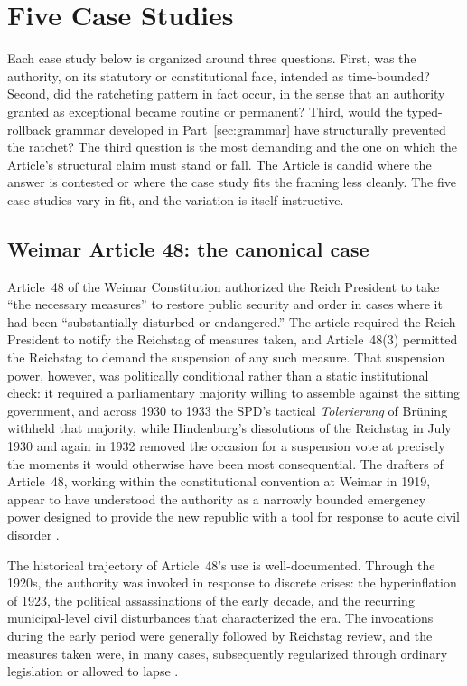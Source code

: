 \section{Five Case Studies}
\label{sec:cases}

Each case study below is organized around three questions.
First, was the authority, on its statutory or constitutional face, intended as time-bounded?
Second, did the ratcheting pattern in fact occur,
in the sense that an authority granted as exceptional became routine or permanent?
Third, would the typed-rollback grammar developed in Part~\ref{sec:grammar} have structurally prevented the ratchet?
The third question is the most demanding and the one on which the Article's structural claim must stand or fall.
The Article is candid where the answer is contested or where the case study fits the framing less cleanly.
The five case studies vary in fit, and the variation is itself instructive.

\subsection{Weimar Article 48: the canonical case}
\label{sec:cases:weimar}

Article~48 of the Weimar Constitution \cite{ref_weimar_const_art48} authorized the Reich President
to take ``the necessary measures'' to restore public security and order
in cases where it had been ``substantially disturbed or endangered.''
The article required the Reich President to notify the Reichstag of measures taken,
and Article~48(3) permitted the Reichstag to demand the suspension of any such measure.
That suspension power, however, was politically conditional rather than a static institutional check:
it required a parliamentary majority willing to assemble against the sitting government, and across
1930 to 1933 the SPD's tactical \emph{Tolerierung} of Br\"uning withheld that majority, while
Hindenburg's dissolutions of the Reichstag in July 1930 and again in 1932 removed the occasion for a
suspension vote at precisely the moments it would otherwise have been most consequential.
The drafters of Article~48, working within the constitutional convention at Weimar in 1919,
appear to have understood the authority as a narrowly bounded emergency power
designed to provide the new republic with a tool for response to acute civil disorder
\cite{ref_caldwell_popular_sovereignty,ref_jacobson_weimar_pdf,ref_jacobson_schlink_weimar}.

The historical trajectory of Article~48's use is well-documented.
Through the 1920s, the authority was invoked in response to discrete crises:
the hyperinflation of 1923, the political assassinations of the early decade,
and the recurring municipal-level civil disturbances that characterized the era.
The invocations during the early period were generally followed by Reichstag review,
and the measures taken were, in many cases, subsequently regularized through ordinary legislation
or allowed to lapse \cite{ref_kershaw_hitler}.

